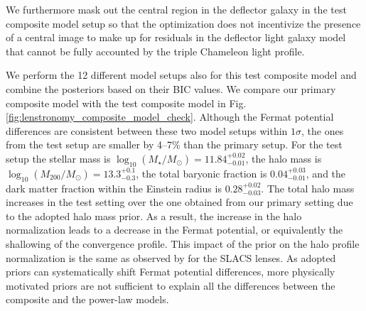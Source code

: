 \documentclass[longauth]{aa}
\newcommand{\ajs}[1]{{{#1}}}
\newcommand{\ajsiv}[1]{{{#1}}}
\begin{document}
We furthermore mask out the central region in the deflector galaxy in \ajsiv{the} test composite model setup so that the optimization does not incentivize the presence of a central image to make up for residuals in the deflector light galaxy model that cannot be fully accounted by the triple Chameleon light profile.

We perform the 12 different model setups also for this test composite model and combine the posteriors based on their BIC values. We compare our primary composite model with the test composite model in Fig. \ref{fig:lenstronomy_composite_model_check}. Although the Fermat potential differences are consistent between these two model setups \ajs{within $1\sigma$, the ones from the test setup are smaller by 4--7\% than the primary setup. For the test setup the stellar mass is $\log_{10} (M_{\star}/M_{\odot}) = 11.84_{-0.01}^{+0.02}$, the halo mass is $\log_{10} (M_{200}/M_{\odot}) = 13.3_{-0.3}^{+0.1}$, the total baryonic fraction is $0.04_{-0.01}^{+0.03}$, and the dark matter fraction within the Einstein radius is $0.28_{-0.03}^{+0.02}$. The total halo mass increases in the test setting over the one obtained from our primary setting due to the adopted halo mass prior. As a result, the increase in the halo normalization leads to a decrease in the Fermat potential, or equivalently the shallowing of the convergence profile. This impact of the prior on the halo profile normalization is the same as observed by \citet{Shajib21} for the SLACS lenses.} %
\ajs{As adopted priors can systematically shift Fermat potential differences, more physically motivated priors are not sufficient to explain all the differences between the composite and the power-law models.}
\end{document}
